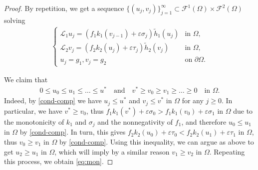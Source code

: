 \documentclass[11pt,oneside,english]{amsart}
\newcommand{\cL}{{\mathcal L}}
\newcommand{\cF}{{\mathcal F}}
\newcommand{\e}{\varepsilon}
\numberwithin{equation}{section}
\theoremstyle{plain}
\numberwithin{equation}{section}
\begin{document}
\begin{proof}
By repetition, we get a sequence $\{(u_j,v_j)\}_{j=1}^\infty\subset \cF^1(\Omega)\times \cF^2(\Omega)$ solving 
\begin{align}\label{eq:sol-seq}
\begin{cases}
        \cL_1 u_j=(f_1k_1(v_{j-1})+\e \sigma_j)\tilde h_1(u_j) &\text{in }\Omega,\\
        \cL_2 v_j=(f_2k_2(u_j)+\e \tau_j)\tilde h_2(v_j) &\text{in }\Omega,\\
        u_j=g_1,v_j=g_2&\text{on }\partial\Omega.
    \end{cases}
\end{align}

We claim that
\begin{align}
    \label{eq:mon}
    0\le u_0\le u_1\le\ldots\le u^*\quad\text{and}\quad v^*\ge v_0\ge v_1\ge\ldots\ge0\quad\text{in }\Omega.
\end{align} 
Indeed, 
by \ref{cond-comp} we have $u_j\le u^*$ and $v_j\le v^*$ in $\Omega$ for any $j\ge0$. 
In particular, we have $v^*\ge v_0$, thus $f_1k_1(v^*)+\e \sigma_0>f_1k_1(v_0)+\e \sigma_1$ in $\Omega$ due to the monotonicity of $k_1$ and $\sigma_j$ and the nonnegativity of $f_1$, and therefore $u_0\le u_1$ in $\Omega$ by \ref{cond-comp}. In turn, this gives $f_2k_2(u_0)+\e \tau_0<f_2k_2(u_1)+\e \tau_1$ in $\Omega$, thus $v_0\ge v_1$ in $\Omega$ by \ref{cond-comp}. Using this inequality, we can argue as above to get $u_2\ge u_1$ in $\Omega$, which will imply by a similar reason $v_1\ge v_2$ in $\Omega$. Repeating this process, we obtain \eqref{eq:mon}.


\end{proof}
\end{document}
